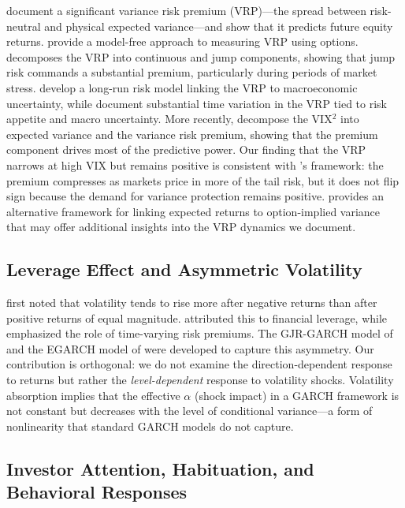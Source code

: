 \documentclass[12pt,a4paper]{article}
\begin{document}
\citet{bollerslev2009} document a significant variance risk premium (VRP)---the spread between risk-neutral and physical expected variance---and show that it predicts future equity returns. \citet{carr2009} provide a model-free approach to measuring VRP using options. \citet{todorov2010} decomposes the VRP into continuous and jump components, showing that jump risk commands a substantial premium, particularly during periods of market stress. \citet{drechsler2011} develop a long-run risk model linking the VRP to macroeconomic uncertainty, while \citet{bekaert2022} document substantial time variation in the VRP tied to risk appetite and macro uncertainty. More recently, \citet{bekaert2014} decompose the VIX$^2$ into expected variance and the variance risk premium, showing that the premium component drives most of the predictive power. Our finding that the VRP narrows at high VIX but remains positive is consistent with \citet{bollerslev2009}'s framework: the premium compresses as markets price in more of the tail risk, but it does not flip sign because the demand for variance protection remains positive. \citet{martin2017} provides an alternative framework for linking expected returns to option-implied variance that may offer additional insights into the VRP dynamics we document.

\subsection{Leverage Effect and Asymmetric Volatility}

\citet{black1976} first noted that volatility tends to rise more after negative returns than after positive returns of equal magnitude. \citet{christie1982} attributed this to financial leverage, while \citet{bekaert2000} emphasized the role of time-varying risk premiums. The GJR-GARCH model of \citet{glosten1993} and the EGARCH model of \citet{nelson1991} were developed to capture this asymmetry. Our contribution is orthogonal: we do not examine the direction-dependent response to returns but rather the \textit{level-dependent} response to volatility shocks. Volatility absorption implies that the effective $\alpha$ (shock impact) in a GARCH framework is not constant but decreases with the level of conditional variance---a form of nonlinearity that standard GARCH models do not capture.

\subsection{Investor Attention, Habituation, and Behavioral Responses}
\end{document}
